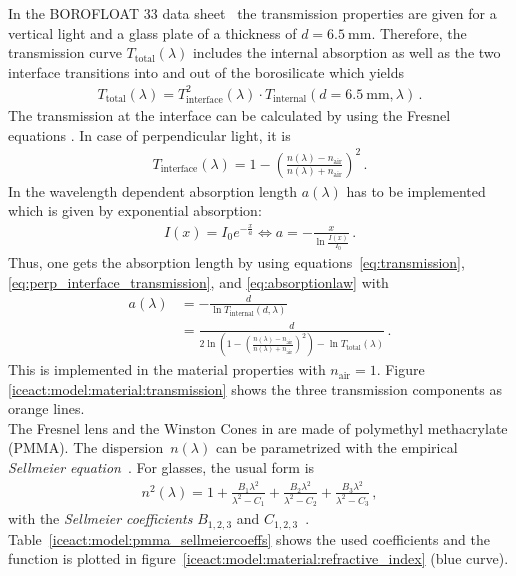 In the BOROFLOAT\textsuperscript{\textregistered} 33 data sheet~\cite{iceact:borosilicate:datasheet} the transmission properties are given for a vertical light and a glass plate of a thickness of $d = \SI{6.5}{\milli\meter}$. Therefore, the transmission curve $T_\text{total}(\lambda)$ includes the internal absorption as well as the two interface transitions into and out of the borosilicate which yields
\begin{align}
	T_\text{total}(\lambda) = T_\text{interface}^2(\lambda)\cdot T_\text{internal}(d=\SI{6.5}{\milli\meter},\lambda)\,.
	\label{eq:transmission}
\end{align}
The transmission at the interface can be calculated by using the Fresnel equations \cite{fresnel_equations}. In case of perpendicular light, it is
\begin{align}
	T_\text{interface}(\lambda) = 1 - \left(\frac{n(\lambda)-n_\text{air}}{n(\lambda)+n_\text{air}}\right)^2\,.
	\label{eq:perp_interface_transmission}
\end{align}
In \geant the wavelength dependent absorption length $a(\lambda)$ has to be implemented which is given by exponential absorption:
\begin{align}
	I(x) = I_0 e^{-\frac{x}{a}} \Leftrightarrow a = - \frac{x}{\ln{\frac{I(x)}{I_0}}}\,.
	\label{eq:absorptionlaw}
\end{align}
Thus, one gets the absorption length by using equations~\eqref{eq:transmission}, \eqref{eq:perp_interface_transmission}, and \eqref{eq:absorptionlaw} with
\begin{align}
	a(\lambda) &= - \frac{d}{\ln T_\text{internal}(d,\lambda)}\nonumber\\
	&= \frac{d}{2\ln\left(1 - \left(\frac{n(\lambda)-n_\text{air}}{n(\lambda)+n_\text{air}}\right)^2\right)-\ln T_\text{total}(\lambda)}\,.
\end{align}
This is implemented in the \geant material properties with $n_\text{air} = 1$. Figure \ref{iceact:model:material:transmission} shows the three transmission components as orange lines.\\

The Fresnel lens and the Winston Cones in \iceact are made of polymethyl methacrylate (PMMA). The dispersion~$n(\lambda)$ can be parametrized with the empirical \textit{Sellmeier equation}~\cite{iceact:sellmeier}. For glasses, the usual form is
\begin{align}
	n^2(\lambda) = 1 + \frac{B_1\lambda^2}{\lambda^2-C_1} + \frac{B_2\lambda^2}{\lambda^2-C_2} + \frac{B_3\lambda^2}{\lambda^2-C_3}\,,
	\label{eq:sellmeier}
\end{align}
with the \textit{Sellmeier coefficients} $B_{1,2,3}$ and $C_{1,2,3}$~\cite{iceact:sellmeier}. Table~\ref{iceact:model:pmma_sellmeiercoeffs} shows the used coefficients and the function is plotted in figure~\ref{iceact:model:material:refractive_index} (blue curve).

